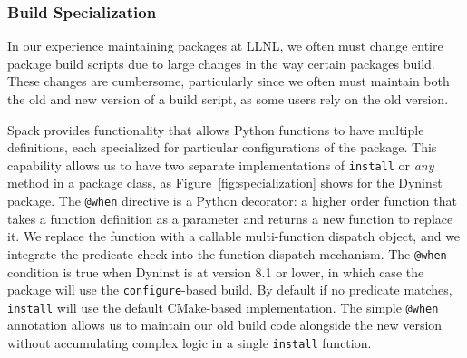 \subsubsection{Build Specialization}

In our experience maintaining packages at LLNL, we often must change
entire package build scripts due to large changes in the way certain packages build.
These changes are cumbersome, particularly since we often must maintain both
the old and new version of a build script, as some users rely on the old version.


%

Spack provides functionality that allows Python functions to have
multiple definitions, each specialized for particular configurations of the package.
This capability allows us to have two separate implementations of {\tt install} or {\it any} method
in a package class, as Figure~\ref{fig:specialization} shows for the Dyninst
package.  The {\tt @when} directive is a Python decorator: a higher order function that
takes a function definition as a parameter and returns a new function to replace it.
We replace the function with a callable multi-function dispatch object, and we
integrate the predicate check into the function dispatch mechanism.  The
{\tt @when} condition is true when Dyninst is at version 8.1 or lower, in which
case the package will use the {\tt configure}-based build.  By default if no predicate matches,
{\tt install} will use the default CMake-based implementation. The simple {\tt @when}
annotation allows us to maintain our old build code alongside the new version without
accumulating complex logic in a single {\tt install} function.
